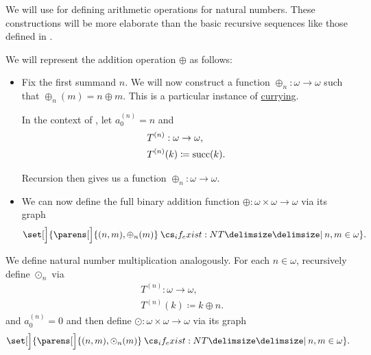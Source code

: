 \begin{definition}\label{def:omega_operations}\mimprovised
  We will use  for defining arithmetic operations for natural numbers. These constructions will be more elaborate than the basic recursive sequences like those defined in .

  \begin{thmenum}
     We will represent the addition operation \( \oplus \) as follows:

    \begin{itemize}
      \item Fix the first summand \( n \). We will now construct a function \( \oplus_n: \omega \to \omega \) such that \( \oplus_n(m) = n \oplus m \). This is a particular instance of \hyperref[def:function_currying]{currying}.

      In the context of , let \( a_0^{(n)} = n \) and
      \begin{equation*}
        \begin{aligned}
          &T^{(n)}: \omega \to \omega, \\
          &T^{(n)}(k) \coloneqq \operatorname{succ}(k).
        \end{aligned}
      \end{equation*}

      Recursion then gives us a function \( \oplus_n: \omega \to \omega \).

      \item We can now define the full binary addition function \( \oplus: \omega \times \omega \to \omega \) via its graph
      \begin{equation*}
        \set[\Big]{ \parens[\Big]{ (n, m), \oplus_n(m) } \given* n, m \in \omega }.
      \end{equation*}
    \end{itemize}

     We define natural number multiplication analogously. For each \( n \in \omega \), recursively define \( \odot_n \) via
    \begin{equation*}
      \begin{aligned}
        &T^{(n)}: \omega \to \omega, \\
        &T^{(n)}(k) \coloneqq k \oplus n.
      \end{aligned}
    \end{equation*}
    and \( a_0^{(n)} = 0 \) and then define \( \odot: \omega \times \omega \to \omega \) via its graph
    \begin{equation*}
      \set[\Big]{ \parens[\Big]{ (n, m), \odot_n(m) } \given* n, m \in \omega }.
    \end{equation*}
  \end{thmenum}
\end{definition}

